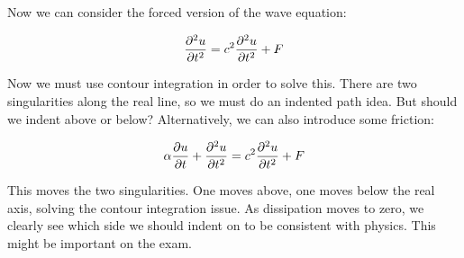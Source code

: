 \documentclass{article}
\theoremstyle{definition}
\begin{document}
Now we can consider the forced version of the wave equation:

\begin{align*}
\pdv{^2u}{t^2} = c^2 \pdv{^2 u}{t^2} + F
\end{align*}

Now we must use contour integration in order to solve this. There are two singularities along the real line, so we must do an indented path idea. But should we indent above or below? Alternatively, we can also introduce some friction:

\begin{align*}
\alpha \pdv{u}{t} + \pdv{^2u}{t^2} = c^2 \pdv{^2 u}{t^2} + F
\end{align*}

This moves the two singularities. One moves above, one moves below the real axis, solving the contour integration issue. As dissipation moves to zero, we clearly see which side we should indent on to be consistent with physics. This might be important on the exam. 



\end{document}
